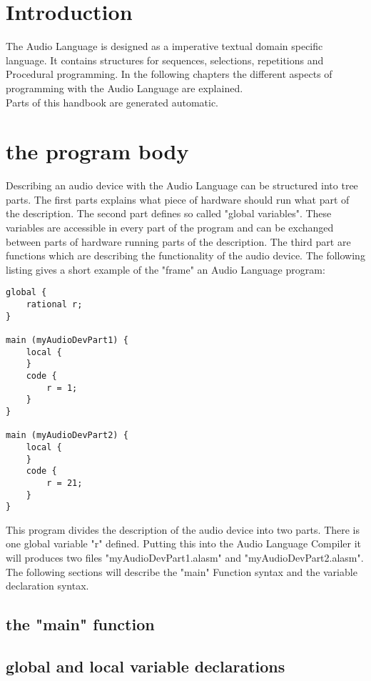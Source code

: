\chapter{Introduction}

The Audio Language is designed as a imperative textual domain specific language. It contains structures for sequences, selections, repetitions and Procedural programming. In the following chapters the different aspects of programming with the Audio Language are explained.\\
Parts of this handbook are generated automatic.

\chapter{the program body}
Describing an audio device with the Audio Language can be structured into tree parts. The first parts explains what piece of hardware should run what part of the description. The second part defines so called "global variables". These variables are accessible in every part of the program and can be exchanged between parts of hardware running parts of the description. The third part are functions which are describing the functionality of the audio device. The following listing gives a short example of the "frame" an Audio Language program:
\begin{lstlisting}
global {
	rational r;
}

main (myAudioDevPart1) {
	local {
	}
	code {
		r = 1;
	}	
}

main (myAudioDevPart2) {
	local {
	}
	code {
		r = 21;
	}	
}
\end{lstlisting}
This program divides the description of the audio device into two parts. There is one global variable "r" defined. Putting this into the Audio Language Compiler it will produces two files "myAudioDevPart1.alasm" and "myAudioDevPart2.alasm". The following sections will describe the "main" Function syntax and the variable declaration syntax.

\section{the "main" function}

\section{global and local variable declarations}